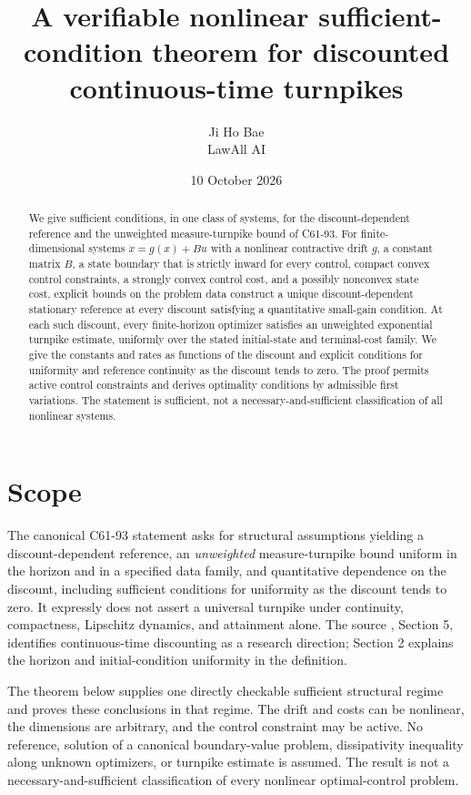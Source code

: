 \documentclass[11pt,a4paper]{article}
\title{A verifiable nonlinear sufficient-condition theorem for discounted continuous-time turnpikes}
\author{Ji Ho Bae\\\small LawAll AI}
\date{10 October 2026}
\begin{document}
\maketitle

\begin{abstract}
We give sufficient conditions, in one class of systems, for the
discount-dependent reference and the unweighted measure-turnpike bound
of C61-93.
For finite-dimensional systems $\dot x=g(x)+Bu$ with a nonlinear contractive
drift $g$, a constant matrix $B$, a state boundary that is strictly inward
for every control, compact convex control constraints, a strongly convex
control cost, and a possibly nonconvex state cost, explicit bounds on the
problem data construct a unique discount-dependent stationary reference at
every discount satisfying a quantitative small-gain condition. At each such
discount, every finite-horizon optimizer satisfies an unweighted exponential
turnpike estimate, uniformly over the stated initial-state and terminal-cost
family. We give the
constants and rates as functions of the discount and explicit conditions
for uniformity and reference continuity as the discount tends to zero.
The proof permits active control constraints and derives optimality
conditions by admissible first variations. The statement is sufficient,
not a necessary-and-sufficient classification of all nonlinear systems.
\end{abstract}

\section{Scope}
The canonical C61-93 statement asks for structural assumptions yielding a
discount-dependent reference, an \emph{unweighted} measure-turnpike bound
uniform in the horizon and in a specified data family, and quantitative
dependence on the discount, including sufficient conditions for uniformity
as the discount tends to zero. It expressly does not assert a universal
turnpike under continuity, compactness, Lipschitz dynamics, and attainment
alone. The source \cite{overview}, Section 5, identifies continuous-time
discounting as a research direction; Section 2 explains the horizon and
initial-condition uniformity in the definition.

The theorem below supplies one directly checkable sufficient
structural regime and proves these conclusions in that
regime. The drift and costs can be nonlinear, the dimensions are arbitrary,
and the control constraint may be active. No reference, solution of a
canonical boundary-value problem, dissipativity inequality along unknown
optimizers, or turnpike estimate is assumed. The result is not a
necessary-and-sufficient classification of every nonlinear optimal-control
problem.
\end{document}
